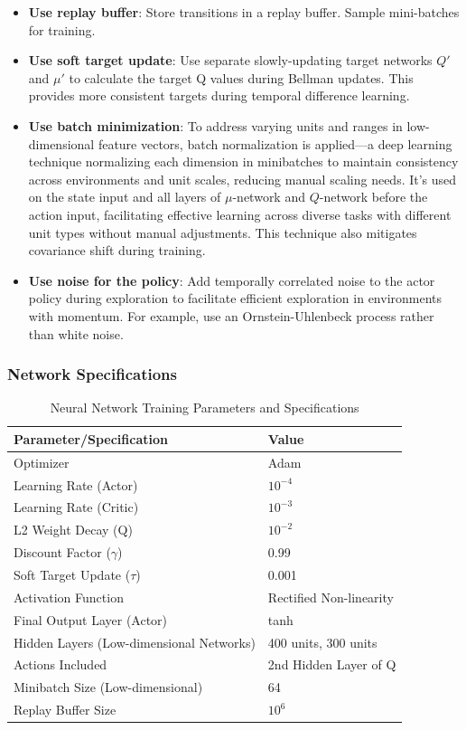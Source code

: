 \documentclass{article}
\begin{document}
\begin{itemize}
\item \textbf{Use replay buffer}: Store transitions in a replay buffer. Sample mini-batches for training.

\item \textbf{Use soft target update}: Use separate slowly-updating target networks $Q'$ and $\mu'$ to calculate the target Q values during Bellman updates. This provides more consistent targets during temporal difference learning.

\item \textbf{Use batch minimization}: To address varying units and ranges in low-dimensional feature vectors, batch normalization is applied—a deep learning technique normalizing each dimension in minibatches to maintain consistency across environments and unit scales, reducing manual scaling needs. It's used on the state input and all layers of $\mu$-network and $Q$-network before the action input, facilitating effective learning across diverse tasks with different unit types without manual adjustments. This technique also mitigates covariance shift during training.

\item \textbf{Use noise for the policy}: Add temporally correlated noise to the actor policy during exploration to facilitate efficient exploration in environments with momentum. For example, use an Ornstein-Uhlenbeck process rather than white noise.
\end{itemize}

\subsubsection{Network Specifications}
\begin{table}[h!]
\centering
\begin{tabular}{l|l}
\textbf{Parameter/Specification} & \textbf{Value} \\
\hline
Optimizer & Adam \\
Learning Rate (Actor) & $10^{-4}$ \\
Learning Rate (Critic) & $10^{-3}$ \\
L2 Weight Decay (Q) & $10^{-2}$ \\
Discount Factor ($\gamma$) & 0.99 \\
Soft Target Update ($\tau$) & 0.001 \\
Activation Function & Rectified Non-linearity \\
Final Output Layer (Actor) & tanh \\
Hidden Layers (Low-dimensional Networks) & 400 units, 300 units \\
Actions Included & 2nd Hidden Layer of Q \\
Minibatch Size (Low-dimensional) & 64 \\
Replay Buffer Size & $10^6$ \\
\end{tabular}
\caption{Neural Network Training Parameters and Specifications}
\end{table}
\end{document}
